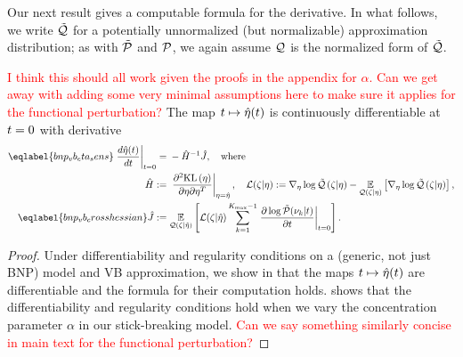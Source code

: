 Our next result gives a computable formula for the derivative. In what follows, we write $\tilde{\mathcal{Q}}$ for a potentially unnormalized (but normalizable) approximation distribution; as with $\tilde{\mathcal{P}}$ and $\mathcal{P}$, we again assume $\mathcal{Q}$ is the normalized form of $\tilde{\mathcal{Q}}$.
%
\begin{thm}
%
\textcolor{red}{I think this should all work given the proofs in the appendix for $\alpha$. Can we get away with adding some very minimal assumptions here to make sure it applies for the functional perturbation?}
The map $t \mapsto
\hat\eta(t)$ is continuously differentiable at $t=0$ with derivative
%
\begin{align}
%
\eqlabel{bnp_vb_eta_sens}
\fracat{d \etaopt(\t)}{d \t}{\t=0} ={}&
    - \hessopt^{-1} \crosshessian, \mathwhere \\
%
\hessopt :={}& \fracat{\partial^2 \KL{\eta}}
                      {\partial \eta \partial \eta^T}
                      {\eta = \etaopt}, 
\quad \lqgradbar{\zeta \vert \eta} :={}
    \lqgrad{\zeta \vert \eta} -
    \expect{\q(\zeta \vert \eta)}{\lqgrad{\zeta \vert \eta}}, \\
%
\eqlabel{bnp_vb_crosshessian}
\crosshessian :={}&
    \expect{\q(\zeta \vert \etaopt)}{
          \lqgradbar{\zeta \vert \etaopt}
          \sum_{k=1}^{\kmax-1}
          \fracat{\partial \log \ptil(\nu_k \vert \t)}
                 {\partial \t}{\t=0}}.
%
\end{align}
%
\end{thm}
%
\begin{proof}
Under differentiability and regularity conditions on a (generic, not just BNP) model and VB approximation, we show in  that the maps $t \mapsto \hat\eta(t)$ are differentiable and the formula for their computation holds.  shows that the differentiability and regularity conditions hold when we vary the concentration parameter $\alpha$ in our stick-breaking model. \textcolor{red}{Can we say something similarly concise in main text for the functional perturbation?}
\end{proof}
%


